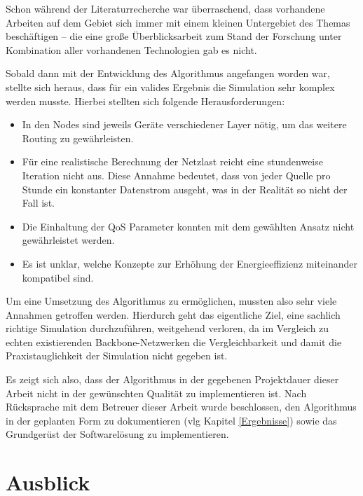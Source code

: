 \documentclass[12pt,titlepage]{article}
\begin{document}
Schon während der Literaturrecherche war überraschend, dass vorhandene Arbeiten auf dem Gebiet sich immer mit einem kleinen Untergebiet des Themas beschäftigen -- die eine große Überblicksarbeit zum Stand der Forschung unter Kombination aller vorhandenen Technologien gab es nicht.

Sobald dann mit der Entwicklung des Algorithmus angefangen worden war, stellte sich heraus, dass für ein valides Ergebnis die Simulation sehr komplex werden musste. Hierbei stellten sich folgende Herausforderungen:
\begin{itemize}
	\item In den Nodes sind jeweils Geräte verschiedener Layer nötig, um das weitere Routing zu gewährleisten. 
	\item Für eine realistische Berechnung der Netzlast reicht eine stundenweise Iteration nicht aus. Diese Annahme bedeutet, dass von jeder Quelle pro Stunde ein konstanter Datenstrom ausgeht, was in der Realität so nicht der Fall ist.
	\item Die Einhaltung der QoS Parameter konnten mit dem gewählten Ansatz nicht gewährleistet werden.
	\item Es ist unklar, welche Konzepte zur Erhöhung der Energieeffizienz miteinander kompatibel sind.
\end{itemize}

Um eine Umsetzung des Algorithmus zu ermöglichen, mussten also sehr viele Annahmen getroffen werden. Hierdurch geht das eigentliche Ziel, eine sachlich richtige Simulation durchzuführen, weitgehend verloren, da im Vergleich zu echten existierenden Backbone-Netzwerken die Vergleichbarkeit und damit die Praxistauglichkeit der Simulation nicht gegeben ist.

Es zeigt sich also, dass der Algorithmus in der gegebenen Projektdauer dieser Arbeit nicht in der gewünschten Qualität zu implementieren ist. Nach Rücksprache mit dem Betreuer dieser Arbeit wurde beschlossen, den Algorithmus in der geplanten Form zu dokumentieren (vlg Kapitel \ref{Ergebnisse}) sowie das Grundgerüst der Softwarelösung zu implementieren. 


\newpage
\section{Ausblick}
\end{document}
